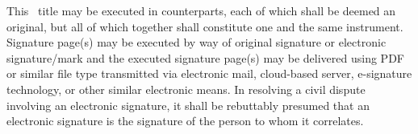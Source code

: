 This \amendmentTitle\ title may be executed in counterparts, each of which shall be deemed an original, but all of which together shall constitute one and the same instrument. Signature page(s) may be executed by way of original signature or electronic signature/mark and the executed signature page(s) may be delivered using PDF or similar file type transmitted via electronic mail, cloud-based server, e-signature technology, or other similar electronic means. In resolving a civil dispute involving an electronic signature, it shall be rebuttably presumed that an electronic signature is the signature of the person to whom it correlates.
